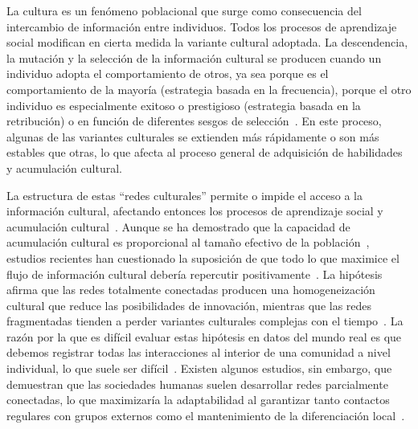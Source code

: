 \documentclass[a4paper,11pt]{book}
\theoremstyle{definition}
\begin{document}

La cultura es un fen\'omeno poblacional que surge como consecuencia del intercambio de informaci\'on entre individuos.
%
Todos los procesos de aprendizaje social modifican en cierta medida la variante cultural adoptada.
%
La descendencia, la mutaci\'on y la selecci\'on de la informaci\'on cultural se producen cuando un individuo adopta el comportamiento de otros, ya sea porque es el comportamiento de la mayor\'ia (estrategia basada en la frecuencia), porque el otro individuo es especialmente exitoso o prestigioso (estrategia basada en la retribuci\'on) o en funci\'on de diferentes sesgos de selecci\'on~\cite{muthukrishna2016-whenAndWhoSocialLearning,rendell2011-cognitiveCulture}.
%
En este proceso, algunas de las variantes culturales se extienden m\'as r\'apidamente o son m\'as estables que otras, lo que afecta al proceso general de adquisici\'on de habilidades y acumulaci\'on cultural.


La estructura de estas ``redes culturales'' permite o impide el acceso a la informaci\'on cultural, afectando entonces los procesos de aprendizaje social y acumulaci\'on cultural~\cite{Derex2020}.
%
Aunque se ha demostrado que la capacidad de acumulaci\'on cultural es proporcional al tama\~no efectivo de la poblaci\'on~\cite{shennan2001-demographyAndCulture,Henrich2004,kempe2014-experiment}, estudios recientes han cuestionado la suposici\'on de que todo lo que maximice el flujo de informaci\'on cultural deber\'ia repercutir positivamente~\cite{Derex2020}.
%
La hip\'otesis afirma que las redes totalmente conectadas producen una homogeneizaci\'on cultural que reduce las posibilidades de innovaci\'on, mientras que las redes fragmentadas tienden a perder variantes culturales complejas con el tiempo~\cite{Derex2018a,Creanza2017}.
%
La raz\'on por la que es dif\'icil evaluar estas hip\'otesis en datos del mundo real es que debemos registrar todas las interacciones al interior de una comunidad a nivel individual, lo que suele ser dif\'icil~\cite{Derex2020}.
%
Existen algunos estudios, sin embargo, que demuestran que las sociedades humanas suelen desarrollar redes parcialmente conectadas, lo que maximizar\'ia la adaptabilidad al garantizar tanto contactos regulares con grupos externos como el mantenimiento de la diferenciaci\'on local~\cite{padilla2022-interconnectivity,migliano2017-hunterGathererNetwork}.

\end{document}
